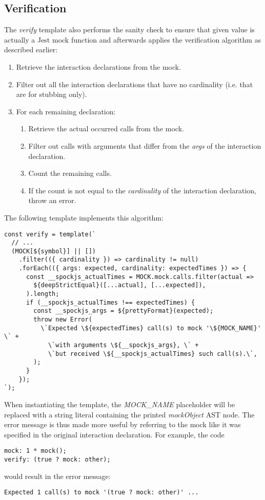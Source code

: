 \subsection{Verification}
The \textit{verify} template also performs the sanity check
to ensure that given value is actually a Jest mock function
and afterwards applies the verification algorithm as described earlier:
\begin{enumerate}
  \item Retrieve the interaction declarations from the mock.
  \item Filter out all the interaction declarations that have no cardinality
    (i.e. that are for stubbing only).
  \item For each remaining declaration:
    \begin{enumerate}
      \item Retrieve the actual occurred calls from the mock.
      \item Filter out calls with arguments that differ from
        the \textit{args} of the interaction declaration.
      \item Count the remaining calls.
      \item If the count is not equal to
        the \textit{cardinality} of the interaction declaration,
        throw an error.
    \end{enumerate}
\end{enumerate}

The following template implements this algorithm:
\begin{verbatim}
const verify = template(`
  // ...
  (MOCK[${symbol}] || [])
    .filter(({ cardinality }) => cardinality != null)
    .forEach(({ args: expected, cardinality: expectedTimes }) => {
      const __spockjs_actualTimes = MOCK.mock.calls.filter(actual =>
        ${deepStrictEqual}([...actual], [...expected]),
      ).length;
      if (__spockjs_actualTimes !== expectedTimes) {
        const __spockjs_args = ${prettyFormat}(expected);
        throw new Error(
          \`Expected \${expectedTimes} call(s) to mock '\${MOCK_NAME}' \` +
            \`with arguments \${__spockjs_args}, \` +
            \`but received \${__spockjs_actualTimes} such call(s).\`,
        );
      }
    });
`);
\end{verbatim}

When instantiating the template,
the \textit{MOCK\_NAME} placeholder
will be replaced with a string literal
containing the printed
\textit{mockObject} AST node.
The error message is thus made more useful
by referring to the mock like it was specified
in the original interaction declaration.
For example, the code
\begin{verbatim}
mock: 1 * mock();
verify: (true ? mock: other);
\end{verbatim}
would result in the error message:
\begin{verbatim}
Expected 1 call(s) to mock '(true ? mock: other)' ...
\end{verbatim}
